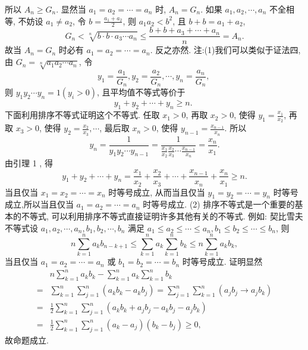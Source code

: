 所以 $A_n \geqslant G_n$.
显然当 $a_1=a_2=\cdots=a_n$ 时, $A_n=G_n$. 如果 $a_1, a_2, \cdots, a_n$ 不全相等, 不妨设 $a_1 \neq a_2$, 令 $b=\frac{a_1+a_2}{2}$, 则 $a_1 a_2<b^2$, 且 $b+b=a_1+a_2$,
$$
G_n<\sqrt[n]{b \cdot b \cdot a_3 \cdots a_n} \leqslant \frac{b+b+a_3+\cdots+a_n}{n}=A_n .
$$
故当 $A_n=G_n$ 时必有 $a_1=a_2=\cdots=a_n$. 反之亦然.
注:(1)我们可以类似于证法四,由 $G_n=\sqrt[n]{a_1 a_2 \cdots a_n}$, 令
$$
y_1=\frac{a_1}{G_n}, y_2=\frac{a_2}{G_n}, \cdots, y_n=\frac{a_n}{G_n} \text {, }
$$
则 $y_1 y_2 \cdots y_n=1\left(y_i>0\right)$, 且平均值不等式等价于
$$
y_1+y_2+\cdots+y_n \geqslant n \text {. }
$$
下面利用排序不等式证明这个不等式.
任取 $x_1>0$, 再取 $x_2>0$, 使得 $y_1=\frac{x_1}{x_2}$, 再取 $x_3>0$, 使得 $y_2=\frac{x_2}{x_3}, \cdots$, 最后取 $x_n>0$, 使得 $y_{n-1}=\frac{x_{n-1}}{x_n}$. 所以
$$
y_n=\frac{1}{y_1 y_2 \cdots y_{n-1}}=\frac{1}{\frac{x_1}{x_2} \frac{x_2}{x_3} \cdots \frac{x_{n-1}}{x_n}}=\frac{x_n}{x_1} .
$$
由引理 1 , 得
$$
y_1+y_2+\cdots+y_n=\frac{x_1}{x_2}+\frac{x_2}{x_3}+\cdots+\frac{x_{n-1}}{x_n}+\frac{x_n}{x_1} \geqslant n .
$$
当且仅当 $x_1=x_2=\cdots=x_n$ 时等号成立, 从而当且仅当 $y_1=y_2=\cdots=y_n$ 时等号成立,所以当且仅当 $a_1=a_2=\cdots=a_n$ 时等号成立.
(2) 排序不等式是一个重要的基本的不等式, 可以利用排序不等式直接证明许多其他有关的不等式.
例如:
契比雪夫不等式设 $a_1, a_2, \cdots, a_n, b_1, b_2, \cdots, b_n$ 满足 $a_1 \leqslant a_2 \leqslant \cdots \leqslant a_n, b_1 \leqslant b_2 \leqslant \cdots \leqslant b_n$, 则
$$
n \sum_{k=1}^n a_k b_{n-k+1} \leqslant \sum_{k=1}^n a_k \sum_{k=1}^n b_k \leqslant n \sum_{k=1}^n a_k b_k,
$$
当且仅当 $a_1=a_2=\cdots=a_n$ 或 $b_1=b_2=\cdots=b_n$ 时等号成立.
证明显然
$$
\begin{aligned}
& n \sum_{k=1}^n a_k b_k-\sum_{k=1}^n a_k \sum_{k=1}^n b_k \\
= & \sum_{k=1}^n \sum_{j=1}^n\left(a_k b_k-a_k b_j\right)=\sum_{j=1}^n \sum_{k=1}^n\left(a_j b_j \rightarrow a_j b_k\right) \\
= & \frac{1}{2} \sum_{k=1}^n \sum_{j=1}^n\left(a_k b_k+a_j b_j-a_k b_j-a_j b_k\right) \\
= & \frac{1}{2} \sum_{k=1}^n \sum_{j=1}^n\left(a_k-a_j\right)\left(b_k-b_j\right) \geqslant 0,
\end{aligned}
$$
故命题成立.



